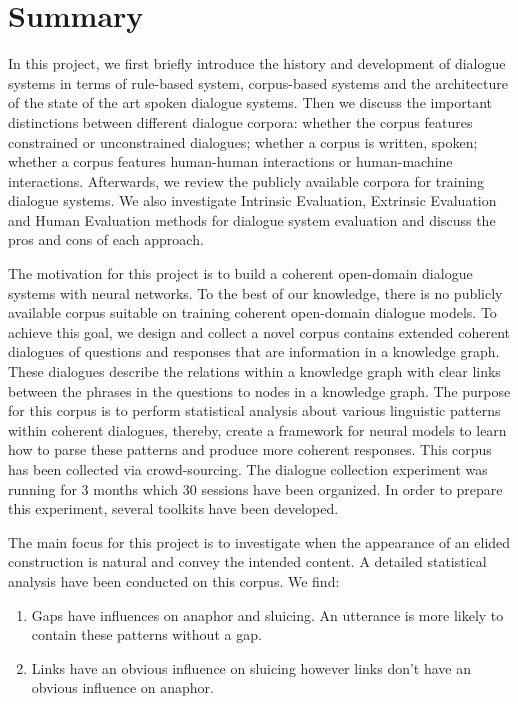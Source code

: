 \documentclass[bsc,frontabs,twoside,singlespacing,parskip,deptreport]{infthesis}     %
\begin{document}
\section{Summary}

In this project, we first briefly introduce the history and development of dialogue systems in terms of rule-based system, corpus-based systems and the architecture of the state of the art spoken dialogue systems. Then we discuss the important distinctions between different dialogue corpora: whether the corpus features constrained or unconstrained dialogues; whether a corpus is written, spoken; whether a corpus features human-human interactions or human-machine interactions. Afterwards, we review the publicly available corpora for training dialogue systems. We also investigate Intrinsic Evaluation, Extrinsic Evaluation and Human Evaluation methods for dialogue system evaluation and discuss the pros and cons of each approach.

The motivation for this project is to build a coherent open-domain dialogue systems with neural networks. To the best of our knowledge, there is no publicly available corpus suitable on training coherent open-domain dialogue models. To achieve this goal, we design and collect a novel corpus contains extended coherent dialogues of questions and responses that are information in a knowledge graph. These dialogues describe the relations within a knowledge graph with clear links between the phrases in the questions to nodes in a knowledge graph. The purpose for this corpus is to perform statistical analysis about various linguistic patterns within coherent dialogues, thereby, create a framework for neural models to learn how to parse these patterns and produce more coherent responses. This corpus has been collected via crowd-sourcing. The dialogue collection experiment was running for 3 months which 30 sessions have been organized. In order to prepare this experiment, several toolkits have been developed.

The main focus for this project is to investigate when the appearance of an elided construction is natural and convey the intended content. A detailed statistical analysis have been conducted on this corpus. We find:
\begin{enumerate}
   \item Gaps have influences on anaphor and sluicing. An utterance is more likely to contain these patterns without a gap.

   \item Links have an obvious influence on sluicing however links don’t have an obvious influence on anaphor.
 
\end{enumerate}
\end{document}
